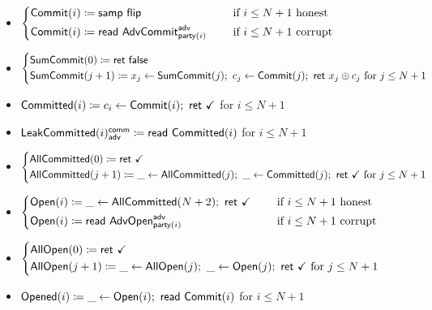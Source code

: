 \begin{itemize}
\item {\color{blue} $\begin{cases*} \Commit(i) \coloneqq \samp{\flip} & \hspace{10pt} \text{if $i \leq N+1$ honest} \\ \Commit(i) \coloneqq \read{\AdvCommit^\adv_{\party(i)}} & \hspace{10pt} \text{if $i \leq N+1$ corrupt} \end{cases*}$}
\item {\color{blue} $\begin{cases*} \SumCommit(0) \coloneqq \ret{\false} \\ \SumCommit(j+1) \coloneqq x_j \leftarrow \SumCommit(j); \ c_j \leftarrow \Commit(j); \ \ret{x_j \oplus c_j} \text{ for $j \leq N+1$} \end{cases*}$}
\item {\color{magenta} $\mathsf{Committed}(i) \coloneqq c_i \leftarrow \mathsf{Commit}(i); \ \mathsf{ret} \ \checkmark$ for $i \leq N+1$}
\item {\color{magenta} $\mathsf{LeakCommitted}(i)^{\mathsf{comm}}_{\mathsf{adv}} \coloneqq \mathsf{read} \ \mathsf{Committed}(i)$ for $i \leq N+1$}
\item {\color{magenta} $\begin{cases*} \AllCommitted(0) \coloneqq \ret{\checkmark} \\ \AllCommitted(j+1) \coloneqq \_ \leftarrow \AllCommitted(j); \ \_ \leftarrow \Committed(j); \ \ret{\checkmark} \text{ for $j \leq N+1$} \end{cases*}$}
\item {\color{teal} $\begin{cases*} \Open(i) \coloneqq \_ \leftarrow \AllCommitted(N+2); \ \ret{\checkmark} & \hspace{10pt} \text{if $i \leq N+1$ honest} \\ \Open(i) \coloneqq \read{\AdvOpen^\adv_{\party(i)}} & \hspace{10pt} \text{if $i \leq N+1$ corrupt} \end{cases*}$}
\item {\color{teal} $\begin{cases*} \AllOpen(0) \coloneqq \ret{\checkmark} \\ \AllOpen(j+1) \coloneqq \_ \leftarrow \AllOpen(j); \ \_ \leftarrow \Open(j); \ \ret{\checkmark} \text{ for $j \leq N+1$} \end{cases*}$}
\item {\color{red} $\mathsf{Opened}(i) \coloneqq \_ \leftarrow \mathsf{Open}(i); \ \mathsf{read} \ \mathsf{Commit}(i)$ for $i \leq N+1$}

\end{itemize}
